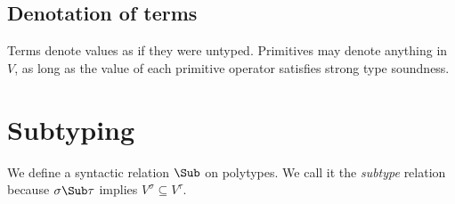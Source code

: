 \documentclass{amsart}
\begin{document}
\subsection*{Denotation of terms} Terms denote values as if they
were untyped. Primitives may denote anything in $V$, as long as
the value of each primitive operator satisfies strong type
soundness.


\section{Subtyping}

We define a syntactic relation $\Sub$ on polytypes. We call it
the \emph{subtype} relation because $\sigma \Sub \tau$ implies
$V^\sigma \subseteq V^\tau$.


\end{document}
